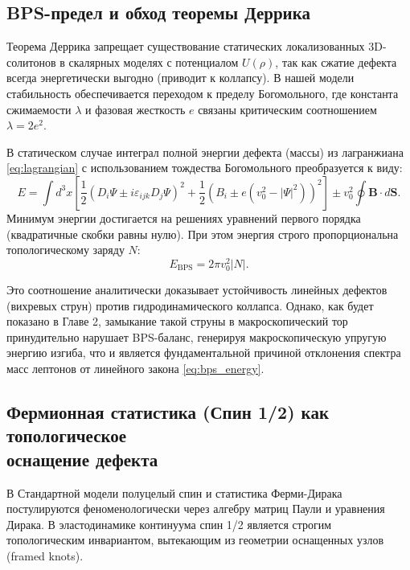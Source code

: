 \documentclass[11pt,a4paper]{article}
\begin{document}
	\subsection{BPS-предел и обход теоремы Деррика}
	Теорема Деррика запрещает существование статических локализованных 3D-солитонов в скалярных моделях с потенциалом $U(\rho)$, так как сжатие дефекта всегда энергетически выгодно (приводит к коллапсу). 
	В нашей модели стабильность обеспечивается переходом к пределу Богомольного, где константа сжимаемости $\lambda$ и фазовая жесткость $e$ связаны критическим соотношением $\lambda = 2e^2$.
	
	В статическом случае интеграл полной энергии дефекта (массы) из лагранжиана \eqref{eq:lagrangian} с использованием тождества Богомольного преобразуется к виду:
	\begin{equation}
		E = \int d^3x \left[ \frac{1}{2} \left( D_i \Psi \pm i \varepsilon_{ijk} D_j \Psi \right)^2 + \frac{1}{2} \left( B_i \pm e(v_0^2 - |\Psi|^2) \right)^2 \right] \pm v_0^2 \oint \mathbf{B} \cdot d\mathbf{S}.
	\end{equation}
	Минимум энергии достигается на решениях уравнений первого порядка (квадратичные скобки равны нулю). При этом энергия строго пропорциональна топологическому заряду $N$:
	\begin{equation}
		E_{\text{BPS}} = 2\pi v_0^2 |N|.
		\label{eq:bps_energy}
	\end{equation}
	
	Это соотношение аналитически доказывает устойчивость линейных дефектов (вихревых струн) против гидродинамического коллапса. Однако, как будет показано в Главе 2, замыкание такой струны в макроскопический тор принудительно нарушает BPS-баланс, генерируя макроскопическую упругую энергию изгиба, что и является фундаментальной причиной отклонения спектра масс лептонов от линейного закона \eqref{eq:bps_energy}.

\subsection{Фермионная статистика (Спин 1/2) как топологическое\\ оснащение дефекта}

	В Стандартной модели полуцелый спин и статистика Ферми-Дирака постулируются феноменологически через алгебру матриц Паули и уравнения Дирака. В эластодинамике континуума спин 1/2 является строгим топологическим инвариантом, вытекающим из геометрии оснащенных узлов (framed knots).
\end{document}
